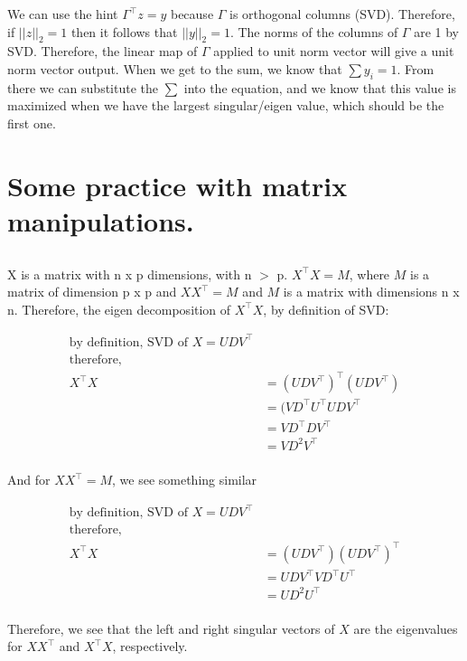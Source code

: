 \documentclass{article}\usepackage[]{graphicx}\usepackage[]{color}
\begin{document}
We can use the hint $\Gamma^\top z = y$ because $\Gamma$ is orthogonal columns (SVD). Therefore, if $||z||_2=1$ then it follows that $||y||_2 =1$. The norms of the columns of $\Gamma$ are 1 by SVD. Therefore, the linear map of $\Gamma$ applied to unit norm vector will give a unit norm vector output. When we get to the sum, we know that $\sum y_i = 1$. From there we can substitute the $\sum$ into the equation, and we know that this value is maximized when we have the largest singular/eigen value, which should be the first one.

\section{Some practice with matrix manipulations.}

\subsection{}

X is a matrix with n x p dimensions, with n $>$ p. $X^\top X = M$, where $M$ is a matrix of dimension p x p and $X X^\top= M$ and $M$ is a matrix with dimensions n x n. Therefore, the eigen decomposition of $X^\top X$, by definition of SVD:

$$\begin{aligned}
\text{by definition, SVD of } X = UDV^\top &\\
\text{therefore, } &\\
X^\top X  &= (UDV^\top)^\top (UDV^\top) \\
&= (VD^\top U^\top UDV^\top \\ 
&= V D^\top D V^\top \\
&= V D^2 V^\top \\
\end{aligned}$$

And for $X X^\top = M$, we see something similar


$$\begin{aligned}
\text{by definition, SVD of } X = UDV^\top &\\
\text{therefore, } & \\
X^\top X  &= (UDV^\top)(UDV^\top)^\top  \\
& = U D V^\top V D^\top U^\top \\
& = U D^2 U^\top  \\
\end{aligned}$$

Therefore, we see that the left and right singular vectors of $X$ are the eigenvalues for $XX^\top$ and $X^\top X$, respectively.
\end{document}
